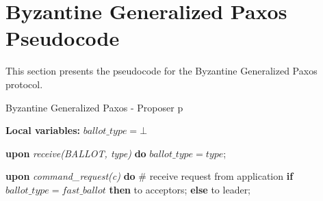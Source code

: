 \section{Byzantine Generalized Paxos Pseudocode}
This section presents the pseudocode for the Byzantine Generalized Paxos protocol. 
\begin{algorithm}[h] 
	\caption{Byzantine Generalized Paxos - Proposer p}
	\label{BFT-Prop}
	\textbf{Local variables:} $ballot\_type = \bot$
	\begin{algorithmic}[1]
			
		\State \textbf{upon} \textit{receive(BALLOT, type)} \textbf{do} 
		\State \hspace{\algorithmicindent} $ballot\_type = type$;
		\State
		
		\State \textbf{upon} \textit{command\_request(c)} \textbf{do}   \hspace{\algorithmicindent}\hspace{\algorithmicindent}\hspace{\algorithmicindent}\hspace{\algorithmicindent}\# receive request from application
		\State \hspace{\algorithmicindent} \textbf{if} $ballot\_type = fast\_ballot$ \textbf{then}
		\State \hspace{\algorithmicindent}\hspace{\algorithmicindent}  to acceptors;
		\State \hspace{\algorithmicindent} \textbf{else} 
		\State \hspace{\algorithmicindent}\hspace{\algorithmicindent}  to leader;		
	\end{algorithmic}
\end{algorithm}
